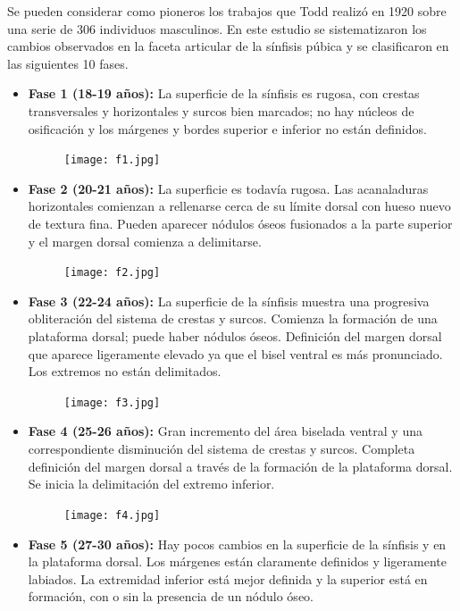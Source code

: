 \documentclass[a4paper,11pt]{article}
\begin{document}
Se pueden considerar como pioneros los trabajos que Todd realizó en 1920 sobre una serie de 306 individuos masculinos. En este estudio se sistematizaron los cambios observados en la faceta articular de la sínfisis púbica y se clasificaron en las siguientes 10 fases.
\begin{itemize}
\item {\bf Fase 1 (18-19 años):} La superficie de la sínfisis es rugosa, con crestas transversales y horizontales y surcos bien marcados; no hay núcleos de osificación y los márgenes y bordes superior e inferior no están definidos.
\begin{figure}[h!]
\centering
\texttt{[image: f1.jpg]}
\end{figure}
\item {\bf Fase 2 (20-21 años):} La superficie es todavía rugosa. Las acanaladuras horizontales comienzan a rellenarse cerca de su límite dorsal con hueso nuevo de textura fina. Pueden aparecer nódulos óseos fusionados a la parte superior y el margen dorsal comienza a delimitarse.
\begin{figure}[h!]
\centering
\texttt{[image: f2.jpg]}
\end{figure}
\item {\bf Fase 3 (22-24 años):} La superficie de la sínfisis muestra una progresiva obliteración del sistema de crestas y surcos. Comienza la formación de una plataforma dorsal; puede haber nódulos óseos. Definición del margen dorsal que aparece ligeramente elevado ya que el bisel ventral es más pronunciado. Los extremos no están delimitados.
\newpage
\begin{figure}[h!]
\centering
\texttt{[image: f3.jpg]}
\end{figure}
\item {\bf Fase 4 (25-26 años):} Gran incremento del área biselada ventral y una correspondiente disminución del sistema de crestas y surcos. Completa definición del margen dorsal a través de la formación de la plataforma dorsal. Se inicia la delimitación del extremo inferior.
\begin{figure}[h!]
\centering
\texttt{[image: f4.jpg]}
\end{figure}
\item {\bf Fase 5 (27-30 años):} Hay pocos cambios en la superficie de la sínfisis y en la plataforma dorsal. Los márgenes están claramente definidos y ligeramente labiados. La extremidad inferior está mejor definida y la superior está en formación, con o sin la presencia de un nódulo óseo.
\begin{figure}[h!]

\end{figure}
\end{itemize}
\end{document}
